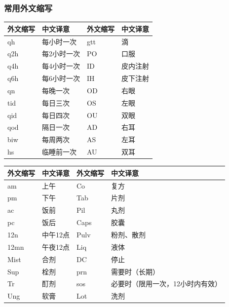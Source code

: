 \documentclass[11pt, a4paper]{ctexart}
\begin{document}
\subsubsection{常用外文缩写}
\begin{table}[htbp]
	\centering
	\begin{tabular}{|l|l|l|l|}
		\hline
		\textbf{外文缩写} & \textbf{中文译意} & \textbf{外文缩写} & \textbf{中文译意} \\
		\hline
		qh            & 每小时一次         & gtt           & 滴             \\
		q2h           & 每2小时一次        & PO            & 口服            \\
		q4h           & 每4小时一次        & ID            & 皮内注射          \\
		q6h           & 每6小时一次        & IH            & 皮下注射          \\
		qn            & 每晚一次          & OD            & 右眼            \\
		tid           & 每日三次          & OS            & 左眼            \\
		qid           & 每日四次          & OU            & 双眼            \\
		qod           & 隔日一次          & AD            & 右耳            \\
		biw           & 每周两次          & AS            & 左耳            \\
		hs            & 临睡前一次         & AU            & 双耳            \\
		\hline
	\end{tabular}
\end{table}
\begin{table}[htbp]
	\centering
	\begin{tabular}{|l|l|l|l|}
		\hline
		\textbf{外文缩写} & \textbf{中文译意} & \textbf{外文缩写} & \textbf{中文译意}     \\
		\hline
		am            & 上午            & Co            & 复方                \\
		pm            & 下午            & Tab           & 片剂                \\
		ac            & 饭前            & Pil           & 丸剂                \\
		pc            & 饭后            & Caps          & 胶囊                \\
		12n           & 中午12点         & Pulv          & 粉剂、散剂             \\
		12mn          & 午夜12点         & Liq           & 液体                \\
		Mist          & 合剂            & DC            & 停止                \\
		Sup           & 栓剂            & prn           & 需要时（长期）           \\
		Tr            & 酊剂            & sos           & 必要时（限用一次，12小时内有效） \\
		Ung           & 软膏            & Lot           & 洗剂                \\
		\hline
	\end{tabular}
\end{table}
\end{document}
